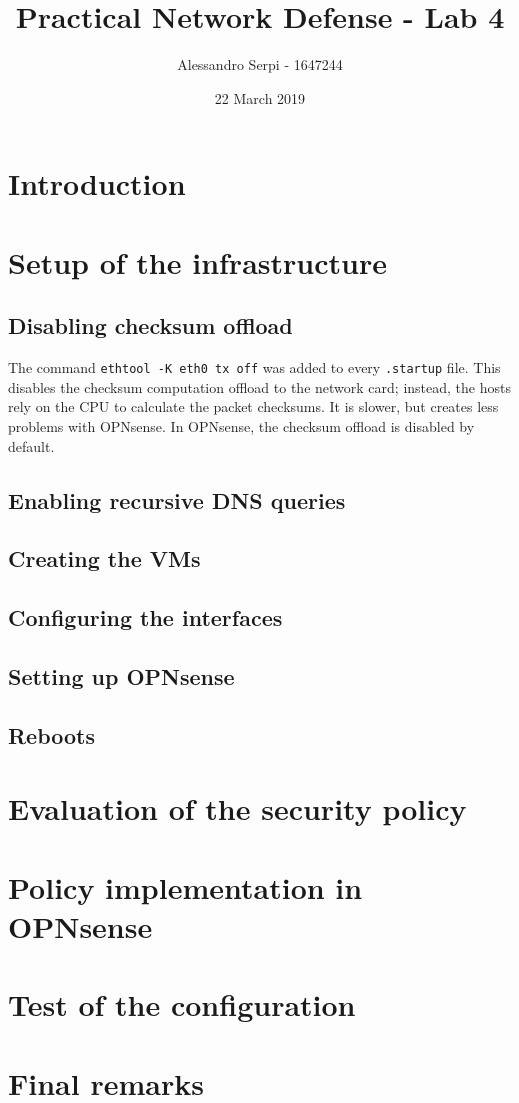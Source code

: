 \documentclass[draft]{homework}
\title{Practical Network Defense - Lab 4}
\author{Alessandro Serpi - 1647244}
\date{22 March 2019}
\newcommand{\opn}{OPNsense\xspace}
\begin{document}
    \maketitle
    \tableofcontents
    
    
    \section{Introduction}
    
    
    \section{Setup of the infrastructure}
    \subsection{Disabling checksum offload}
    The command \texttt{ethtool -K eth0 tx off} was added to every \texttt{.startup} file. This disables the checksum computation offload to the network card; instead, the hosts rely on the CPU to calculate the packet checksums. It is slower, but creates less problems with \opn.
    In \opn, the checksum offload is disabled by default.
    
    \subsection{Enabling recursive DNS queries}
    
    \subsection{Creating the VMs}
    
    \subsection{Configuring the interfaces}
    
    \subsection{Setting up \opn}
    
    \subsection{Reboots}
    
    
    \section{Evaluation of the security policy}
    
    
    \section{Policy implementation in \opn}
    
    
    \section{Test of the configuration}
    
    \section{Final remarks}
\end{document}
